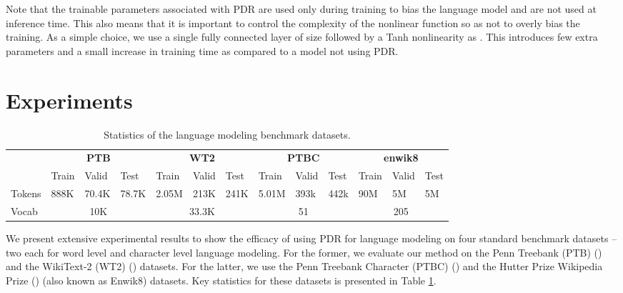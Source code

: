 \documentclass{article} \usepackage{iclr2019_conference,times}
\begin{document}
Note that the trainable parameters  associated with PDR are used only during training to bias the language model and are not used at inference time. This also means that it is important to control the complexity of the nonlinear function  so as not to overly bias the training. As a simple choice, we use a single fully connected layer of size  followed by a Tanh nonlinearity as . This introduces few extra parameters and a small increase in training time as compared to a model not using PDR. 



\section{Experiments}
\begin{table}
\setlength{\tabcolsep}{4pt}
\renewcommand{\arraystretch}{1.2}
\begin{tabular}{l|lll|lll|lll|lll}
\toprule
 & \multicolumn{3}{c|}{\textbf{PTB}} &  \multicolumn{3}{c|}{\textbf{WT2}}  &  \multicolumn{3}{c|}{\textbf{PTBC}} &  \multicolumn{3}{c}{\textbf{enwik8}} \\
& Train & Valid & Test & Train & Valid & Test & Train & Valid & Test & Train & Valid & Test\\
\midrule
Tokens & 888K & 70.4K & 78.7K & 2.05M & 213K & 241K & 5.01M & 393k &  442k &  90M &  5M & 5M   \\
Vocab & \multicolumn{3}{|c|}{10K} & \multicolumn{3}{|c|}{33.3K} & \multicolumn{3}{|c|}{51} & \multicolumn{3}{|c}{205}\\
\bottomrule
\end{tabular}
\caption{Statistics of the language modeling benchmark datasets.}
\label{tab:stats}
\end{table}

We present extensive experimental results to show the efficacy of using PDR for language modeling on four  standard benchmark datasets -- two each for word level and character level language modeling. For the former, we evaluate our method on the Penn Treebank (PTB)  (\cite{Mikolov2010RecurrentNN}) and the WikiText-2 (WT2) (\cite{Merity2016PointerSM}) datasets.  For the latter, we use the Penn Treebank Character (PTBC) (\cite{Mikolov2010RecurrentNN})  and the Hutter Prize Wikipedia Prize (\cite{HutterPrize}) (also known as Enwik8) datasets. Key statistics for these datasets is presented in Table \ref{tab:stats}. 
\end{document}
